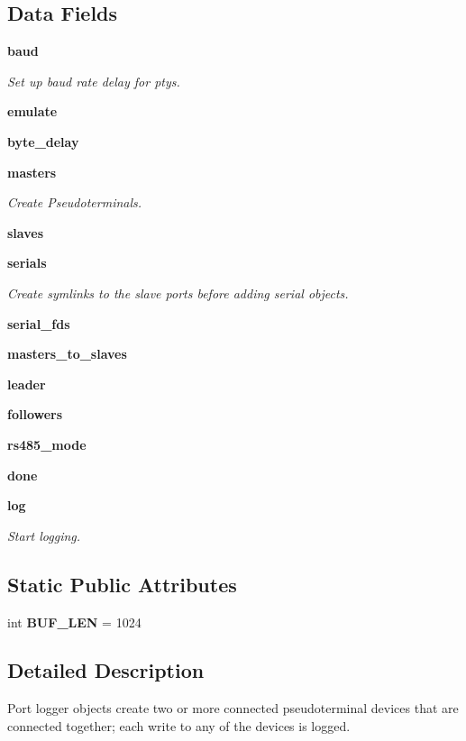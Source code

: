 \subsection*{Data Fields}
\begin{DoxyCompactItemize}
\item 
{\bf baud}
\begin{DoxyCompactList}\small\item\em Set up baud rate delay for ptys. \end{DoxyCompactList}\item 
{\bf emulate}
\item 
{\bf byte\+\_\+delay}
\item 
{\bf masters}
\begin{DoxyCompactList}\small\item\em Create Pseudoterminals. \end{DoxyCompactList}\item 
{\bf slaves}
\item 
{\bf serials}
\begin{DoxyCompactList}\small\item\em Create symlinks to the slave ports before adding serial objects. \end{DoxyCompactList}\item 
{\bf serial\+\_\+fds}
\item 
{\bf masters\+\_\+to\+\_\+slaves}
\item 
{\bf leader}
\item 
{\bf followers}
\item 
{\bf rs485\+\_\+mode}
\item 
{\bf done}
\item 
{\bf log}
\begin{DoxyCompactList}\small\item\em Start logging. \end{DoxyCompactList}\end{DoxyCompactItemize}
\subsection*{Static Public Attributes}
\begin{DoxyCompactItemize}
\item 
int {\bf B\+U\+F\+\_\+\+L\+E\+N} = 1024
\end{DoxyCompactItemize}


\subsection{Detailed Description}
\begin{DoxyVerb}Port logger objects create two or more connected pseudoterminal devices 
    that are connected together; each write to any of the devices is logged.\end{DoxyVerb}
 

